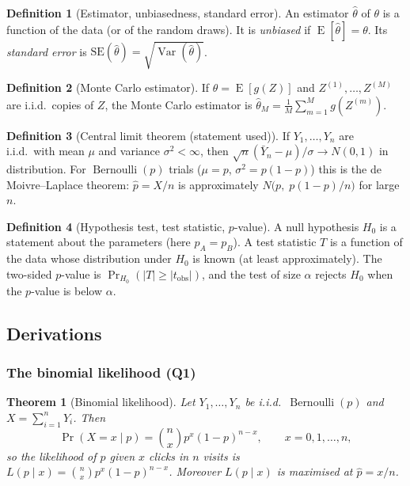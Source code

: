 \documentclass[11pt]{article}
\newtheorem{theorem}{Theorem}
\theoremstyle{definition}
\newtheorem{definition}{Definition}
\theoremstyle{remark}
\renewcommand{\Pr}{\operatorname{Pr}}
\newcommand{\E}{\operatorname{E}}
\newcommand{\Var}{\operatorname{Var}}
\newcommand{\Ber}{\operatorname{Bernoulli}}
\begin{document}
\begin{definition}[Estimator, unbiasedness, standard error]
An estimator $\hat\theta$ of $\theta$ is a function of the data (or of the random draws).
It is \emph{unbiased} if $\E[\hat\theta]=\theta$. Its \emph{standard error} is
$\mathrm{SE}(\hat\theta)=\sqrt{\Var(\hat\theta)}$.
\end{definition}

\begin{definition}[Monte Carlo estimator]
If $\theta=\E[g(Z)]$ and $Z^{(1)},\dots,Z^{(M)}$ are i.i.d.\ copies of $Z$, the Monte Carlo estimator is
$\hat\theta_M=\frac1M\sum_{m=1}^M g(Z^{(m)})$.
\end{definition}

\begin{definition}[Central limit theorem (statement used)]
If $Y_1,\dots,Y_n$ are i.i.d.\ with mean $\mu$ and variance $\sigma^2<\infty$, then
$\sqrt n(\bar Y_n-\mu)/\sigma\to N(0,1)$ in distribution. For $\Ber(p)$ trials
($\mu=p$, $\sigma^2=p(1-p)$) this is the de Moivre--Laplace theorem:
$\hat p=X/n$ is approximately $N\!\big(p,\;p(1-p)/n\big)$ for large $n$.
\end{definition}

\begin{definition}[Hypothesis test, test statistic, $p$-value]
A null hypothesis $H_0$ is a statement about the parameters (here $p_A=p_B$).
A test statistic $T$ is a function of the data whose distribution under $H_0$ is known
(at least approximately). The two-sided $p$-value is $\Pr_{H_0}(|T|\ge|t_{\mathrm{obs}}|)$,
and the test of size $\alpha$ rejects $H_0$ when the $p$-value is below $\alpha$.
\end{definition}

\subsection{Derivations}\label{sec:derivations}

\subsubsection{The binomial likelihood (Q1)}

\begin{theorem}[Binomial likelihood]\label{thm:binom}
Let $Y_1,\dots,Y_n$ be i.i.d.\ $\Ber(p)$ and $X=\sum_{i=1}^n Y_i$. Then
\[
\Pr(X=x\mid p)=\binom{n}{x}p^{x}(1-p)^{n-x},\qquad x=0,1,\dots,n,
\]
so the likelihood of $p$ given $x$ clicks in $n$ visits is $L(p\mid x)=\binom nx p^x(1-p)^{n-x}$.
Moreover $L(p\mid x)$ is maximised at $\hat p=x/n$.
\end{theorem}
\end{document}
